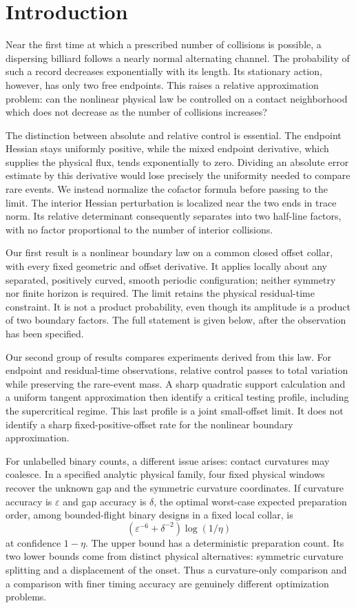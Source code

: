 \section{Introduction}
\label{sec:geometric-results}
Near the first time at which a prescribed number of collisions is possible,
a dispersing billiard follows a nearly normal alternating channel. The
probability of such a record decreases exponentially with its length.
Its stationary action, however, has only two free endpoints. This raises
a relative approximation problem: can the nonlinear physical law be
controlled on a contact neighborhood which does not decrease as the
number of collisions increases?

The distinction between absolute and relative control is essential.
The endpoint Hessian stays uniformly positive, while the mixed endpoint
derivative, which supplies the physical flux, tends exponentially to
zero. Dividing an absolute error estimate by this derivative would lose
precisely the uniformity needed to compare rare events. We instead
normalize the cofactor formula before passing to the limit. The interior
Hessian perturbation is localized near the two ends in trace norm. Its
relative determinant consequently separates into two half-line factors,
with no factor proportional to the number of interior collisions.

Our first result is a nonlinear boundary law on a common closed offset
collar, with every fixed geometric and offset derivative. It applies
locally about any separated, positively curved, smooth periodic
configuration; neither symmetry nor finite horizon is required. The
limit retains the physical residual-time constraint. It is not a product
probability, even though its amplitude is a product of two boundary
factors. The full statement is given below, after the observation has
been specified.

Our second group of results compares experiments derived from this law.
For endpoint and residual-time observations, relative control passes to
total variation while preserving the rare-event mass. A sharp quadratic
support calculation and a uniform tangent approximation then identify a
critical testing profile, including the supercritical regime. This last
profile is a joint small-offset limit. It does not identify a sharp
fixed-positive-offset rate for the nonlinear boundary approximation.

For unlabelled binary counts, a different issue arises: contact
curvatures may coalesce. In a specified analytic physical family, four
fixed physical windows recover the unknown gap and the symmetric
curvature coordinates. If curvature accuracy is $\varepsilon$ and gap
accuracy is $\delta$, the optimal worst-case expected preparation order,
among bounded-flight binary designs in a fixed local collar, is
\[
                (\varepsilon^{-6}+\delta^{-2})\log(1/\eta)
\]
at confidence $1-\eta$. The upper bound has a deterministic preparation
count. Its two lower bounds come from distinct physical alternatives:
symmetric curvature splitting and a displacement of the onset. Thus a
curvature-only comparison and a comparison with finer timing accuracy
are genuinely different optimization problems.

